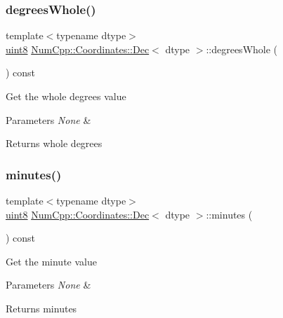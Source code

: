 \subsubsection{\texorpdfstring{degrees\+Whole()}{degreesWhole()}}
{\footnotesize\ttfamily template$<$typename dtype$>$ \\
\mbox{\hyperlink{namespace_num_cpp_aee396d0469d6031cd18118c0a45bcdda}{uint8}} \mbox{\hyperlink{class_num_cpp_1_1_coordinates_1_1_dec}{Num\+Cpp\+::\+Coordinates\+::\+Dec}}$<$ dtype $>$\+::degrees\+Whole (\begin{DoxyParamCaption}{ }\end{DoxyParamCaption}) const\hspace{0.3cm}{\ttfamily [inline]}}

Get the whole degrees value


\begin{DoxyParams}{Parameters}
{\em None} & \\
\hline
\end{DoxyParams}
\begin{DoxyReturn}{Returns}
whole degrees 
\end{DoxyReturn}
\mbox{\label{class_num_cpp_1_1_coordinates_1_1_dec_ae8ac68a953525869d08d144d2cc68429}} 
\subsubsection{\texorpdfstring{minutes()}{minutes()}}
{\footnotesize\ttfamily template$<$typename dtype$>$ \\
\mbox{\hyperlink{namespace_num_cpp_aee396d0469d6031cd18118c0a45bcdda}{uint8}} \mbox{\hyperlink{class_num_cpp_1_1_coordinates_1_1_dec}{Num\+Cpp\+::\+Coordinates\+::\+Dec}}$<$ dtype $>$\+::minutes (\begin{DoxyParamCaption}{ }\end{DoxyParamCaption}) const\hspace{0.3cm}{\ttfamily [inline]}}

Get the minute value


\begin{DoxyParams}{Parameters}
{\em None} & \\
\hline
\end{DoxyParams}
\begin{DoxyReturn}{Returns}
minutes 
\end{DoxyReturn}
\mbox{\label{class_num_cpp_1_1_coordinates_1_1_dec_a23611ec1f4e09d00de3975fb26c3d9dd}} 
